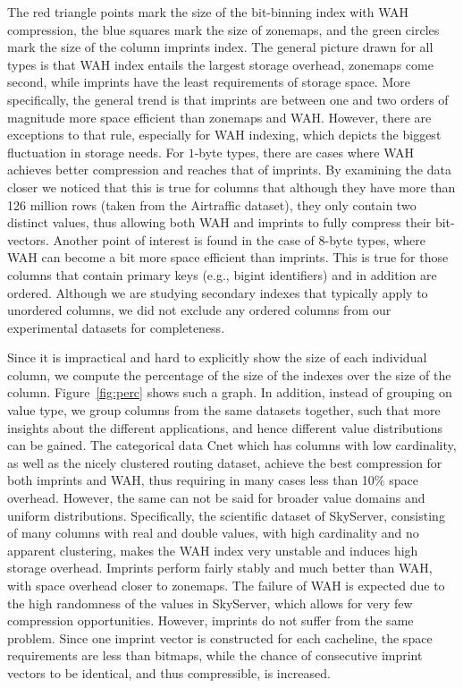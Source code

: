 The red triangle points mark the size of the bit-binning index with WAH
compression, the blue squares mark the size of zone\-maps, and the green
circles mark the size of the column imprints index. The general
picture drawn for all types is that WAH index entails the largest storage
overhead, zonemaps come second, while imprints have the least
requirements of storage space. More specifically, the general trend is that
imprints are between one and two orders of magnitude more space efficient
than zonemaps and WAH. However, there are exceptions to that rule, especially
for WAH indexing, which depicts the biggest fluctuation in storage needs. For
$1$-byte types, there are cases where WAH achieves better compression and
reaches that of imprints. By examining the data closer we noticed that this is
true for columns that although they have more than 126 million rows (taken from
the Airtraffic dataset), they only contain two distinct values, thus allowing
both WAH and imprints to fully compress their bit-vectors. Another point of
interest is found in the case of $8$-byte types, where WAH can become a bit
more space efficient than imprints. This is true for those columns that contain
primary keys (e.g., bigint identifiers) and in addition are ordered.
Although we are studying secondary indexes that typically apply to unordered
columns, we did not exclude any ordered columns from our experimental datasets
for completeness.

Since it is impractical and hard to explicitly show the size of each individual
column, we compute the percentage of the size of the indexes over the size of
the column. Figure~\ref{fig:perc} shows such a graph. In addition, instead of
grouping on value type, we group columns from the same datasets together, such
that more insights about the different applications, and hence different value
distributions can be gained. The categorical data Cnet which has columns with
low cardinality, as well as the nicely clustered routing dataset, achieve the
best compression for both imprints and WAH, thus requiring in many cases
less than 10\% space overhead. However, the same can not be said for broader
value domains and uniform distributions. Specifically, the scientific
dataset of SkyServer, consisting of many columns with real and double values,
with high cardinality and no apparent clustering, makes the WAH index very
unstable and induces high storage overhead. Imprints perform fairly stably
and much better than WAH, with space overhead closer to zonemaps. The failure
of WAH is expected due to the high randomness of the values in SkyServer, which
allows for very few compression opportunities. However, imprints do not suffer
from the same problem. Since one imprint vector is constructed for each
cacheline, the space requirements are less than bitmaps, while the chance of
consecutive imprint vectors to be identical, and thus compressible, is
increased.

